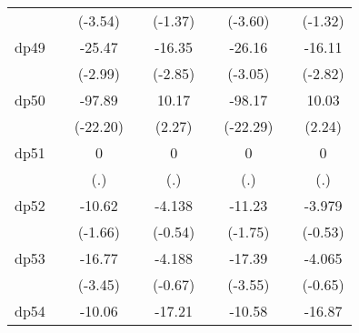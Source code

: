{\begin{tabular}{l*{8}{c}}
            &                     &     (-3.54)         &                     &     (-1.37)         &                     &     (-3.60)         &                     &     (-1.32)         \\
[1em]
dp49        &                     &      -25.47\sym{**} &                     &      -16.35\sym{**} &                     &      -26.16\sym{**} &                     &      -16.11\sym{**} \\
            &                     &     (-2.99)         &                     &     (-2.85)         &                     &     (-3.05)         &                     &     (-2.82)         \\
[1em]
dp50        &                     &      -97.89\sym{***}&                     &       10.17\sym{*}  &                     &      -98.17\sym{***}&                     &       10.03\sym{*}  \\
            &                     &    (-22.20)         &                     &      (2.27)         &                     &    (-22.29)         &                     &      (2.24)         \\
[1em]
dp51        &                     &           0         &                     &           0         &                     &           0         &                     &           0         \\
            &                     &         (.)         &                     &         (.)         &                     &         (.)         &                     &         (.)         \\
[1em]
dp52        &                     &      -10.62         &                     &      -4.138         &                     &      -11.23         &                     &      -3.979         \\
            &                     &     (-1.66)         &                     &     (-0.54)         &                     &     (-1.75)         &                     &     (-0.53)         \\
[1em]
dp53        &                     &      -16.77\sym{***}&                     &      -4.188         &                     &      -17.39\sym{***}&                     &      -4.065         \\
            &                     &     (-3.45)         &                     &     (-0.67)         &                     &     (-3.55)         &                     &     (-0.65)         \\
[1em]
dp54        &                     &      -10.06\sym{*}  &                     &      -17.21\sym{*}  &                     &      -10.58\sym{*}  &                     &      -16.87\sym{*}  \\

\end{tabular}}
